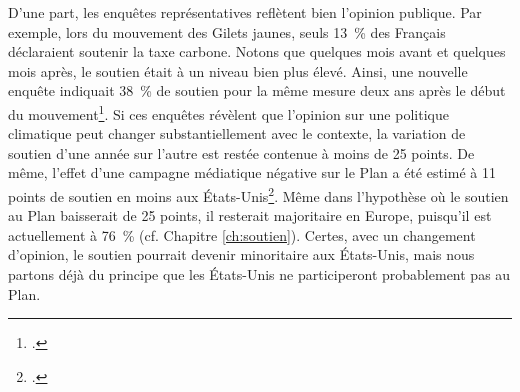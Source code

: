 \documentclass[a5paper,french,openany]{memoir}
\begin{document}
D'une part, les enquêtes représentatives reflètent bien %
l'opinion publique. 
Par exemple, lors du mouvement des Gilets jaunes, 
seuls 13~\% des Français déclaraient soutenir la taxe carbone. Notons que quelques mois avant et quelques mois après, le soutien était à un niveau bien plus élevé. Ainsi, une nouvelle enquête indiquait 38~\% de soutien pour la même mesure deux ans après le début du mouvement\footnote{\cite{douenne_les_2020}.}. Si ces enquêtes révèlent que l'opinion sur une politique climatique peut changer substantiellement avec le contexte, la variation de soutien d'une année sur l'autre est restée contenue à moins de 25 points. De même, l'effet d'une campagne médiatique négative sur le Plan a été estimé à 11 points de soutien en moins 
aux États-Unis\footnote{\cite{fabre_international_2023}.}. Même dans l'hypothèse où le soutien au Plan baisserait de 25 points, il resterait majoritaire en Europe, puisqu'il est actuellement à 76~\% (cf. Chapitre \ref{ch:soutien}). Certes, avec un changement d'opinion, le soutien pourrait devenir minoritaire aux États-Unis, mais nous partons déjà du principe que les États-Unis ne participeront probablement pas au Plan. 
\end{document}
